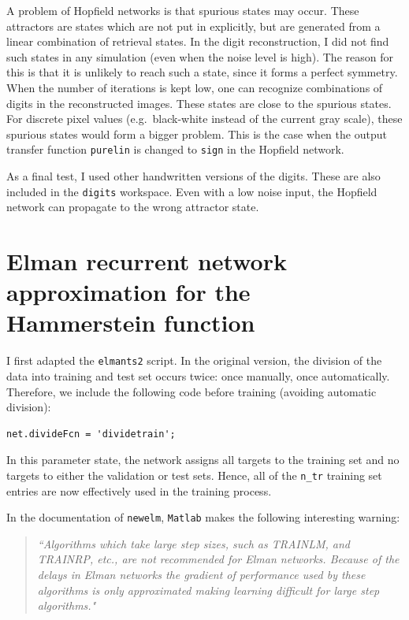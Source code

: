 \documentclass[10pt,a4paper]{article}
\begin{document}
A problem of Hopfield networks is that spurious states may occur. These attractors are states which are not put in explicitly, but are generated from a linear combination of retrieval states. In the digit reconstruction, I did not find such states in any simulation (even when the noise level is high). The reason for this is that it is unlikely to reach such a state, since it forms a perfect symmetry. When the number of iterations is kept low, one can recognize combinations of digits in the reconstructed images. These states are close to the spurious states. For discrete pixel values (e.g.\ black-white instead of the current gray scale), these spurious states would form a bigger problem. This is the case when the output transfer function \texttt{purelin} is changed to \texttt{sign} in the Hopfield network.

As a final test, I used other handwritten versions of the digits. These are also included in the \texttt{digits} workspace. Even with a low noise input, the Hopfield network can propagate to the wrong attractor state.

\section{Elman recurrent network approximation for the Hammerstein function}
I first adapted the \texttt{elmants2} script. In the original version, the division of the data into training and test set occurs twice: once manually, once automatically. Therefore, we include the following code before training (avoiding automatic division):
\lstset{language=Matlab}          %
\begin{lstlisting}
net.divideFcn = 'dividetrain';
\end{lstlisting}
In this parameter state, the network assigns all targets to the training set and no targets to either the validation or test sets. Hence, all of the \texttt{n\_tr} training set entries are now effectively used in the training process.

In the documentation of \texttt{newelm}, \texttt{Matlab} makes the following interesting warning:
\begin{quote}
\textit{``Algorithms which take large step sizes, such as TRAINLM,
     and TRAINRP, etc., are not recommended for Elman networks.  Because
     of the delays in Elman networks the gradient of performance used
     by these algorithms is only approximated making learning difficult
     for large step algorithms."}
\end{quote}
\end{document}
